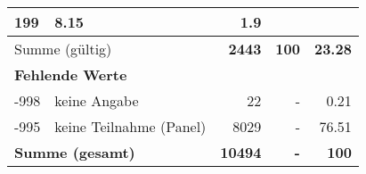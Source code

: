 \begin{longtable}{lXrrr}
       \num{199} &
       \num[round-mode=places,round-precision=2]{8,15} &
         \num[round-mode=places,round-precision=2]{1,9} \\
     \midrule
     \multicolumn{2}{l}{Summe (gültig)} &
       \textbf{\num{2443}} &
     \textbf{100} &
       \textbf{\num[round-mode=places,round-precision=2]{23,28}} \\
     \multicolumn{5}{l}{\textbf{Fehlende Werte}}\\
       -998 &
       keine Angabe &
         \num{22} &
        - &
         \num[round-mode=places,round-precision=2]{0,21} \\
       -995 &
       keine Teilnahme (Panel) &
         \num{8029} &
        - &
         \num[round-mode=places,round-precision=2]{76,51} \\
     \midrule
     \multicolumn{2}{l}{\textbf{Summe (gesamt)}} &
          \textbf{\num{10494}} &
        \textbf{-} &
        \textbf{100} \\
     \bottomrule
     \end{longtable}
     

